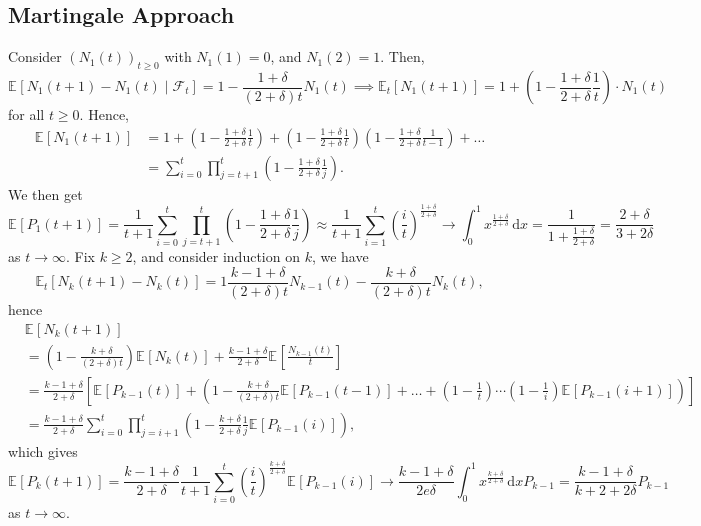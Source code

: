 \subsection{Martingale Approach}
Consider \((N_1(t))_{t \geq 0}\) with \(N_1(1) = 0\), and \(N_1(2) = 1\). Then,
\[
	\mathbb{E}_{}[N_1(t+1) - N_1(t) \mid \mathcal{F} _t]
	= 1 - \frac{1 + \delta }{(2 + \delta ) t} N_1(t)
	\implies \mathbb{E}_{t}[N_1(t+1)]
	= 1 + \left( 1 - \frac{1+\delta }{2 + \delta } \frac{1}{t} \right) \cdot N_1(t)
\]
for all \(t \geq 0\). Hence,
\[
	\begin{split}
		\mathbb{E}_{}[N_1(t+1)]
		 & = 1 + \left( 1 - \frac{1+\delta }{2 + \delta } \frac{1}{t} \right) + \left( 1 - \frac{1+\delta }{2 + \delta } \frac{1}{t} \right) \left( 1 - \frac{1+\delta }{2 + \delta } \frac{1}{t-1} \right) + \dots \\
		 & = \sum_{i=0}^{t} \prod_{j=t+1}^{t} \left( 1 - \frac{1 + \delta }{2 + \delta } \frac{1}{j} \right) .
	\end{split}
\]
We then get
\[
	\mathbb{E}_{}[P_1(t+1)]
	= \frac{1}{t+1} \sum_{i=0}^{t} \prod_{j=t+1}^{t} \left( 1 - \frac{1 + \delta }{2 + \delta } \frac{1}{j} \right)
	\approx \frac{1}{t+1} \sum_{i=1}^{t} \left( \frac{i}{t} \right) ^{\frac{1+\delta }{2 + \delta }}
	\to \int_{0}^{1} x^{\frac{1+\delta }{2 + \delta }} \,\mathrm{d}x
	= \frac{1}{1 + \frac{1+\delta }{2 + \delta }}
	= \frac{2+\delta }{3 + 2\delta }
\]
as \(t \to \infty \). Fix \(k \geq 2\), and consider induction on \(k\), we have
\[
	\mathbb{E}_{t}[N_k(t+1) - N_k(t)]
	= 1 \frac{k-1+\delta }{(2 + \delta ) t} N_{k-1}(t) - \frac{k+\delta }{(2 + \delta )t} N_k(t),
\]
hence
\[
	\begin{split}
		 & \mathbb{E}_{}[N_k(t+1)]                                                                                                                                                                                                                                                    \\
		 & = \left( 1 - \frac{k+\delta }{(2 + \delta )t} \right) \mathbb{E}_{}[N_k(t)] + \frac{k-1+\delta }{2+\delta } \mathbb{E}_{}\left[ \frac{N_{k-1}(t)}{t} \right]                                                                                                               \\
		 & = \frac{k-1+\delta }{2 + \delta } \left[ \mathbb{E}_{}[P_{k-1}(t)] + \left( 1 - \frac{k+\delta }{(2 + \delta )t} \mathbb{E}_{}[P_{k-1} (t-1)] + \dots + \left( 1 - \frac{1}{t} \right) \cdots \left( 1 - \frac{1}{i} \right) \mathbb{E}_{}[P_{k-1} (i+1)] \right)  \right] \\
		 & = \frac{k-1+\delta }{2 + \delta } \sum_{i=0}^{t} \prod_{j=i+1}^{t} \left( 1 - \frac{k+\delta }{2 + \delta } \frac{1}{j} \mathbb{E}_{}[P_{k-1} (i)] \right) ,
	\end{split}
\]
which gives
\[
	\mathbb{E}_{}[P_{k}(t+1)]
	= \frac{k-1+\delta }{2 + \delta } \frac{1}{t+1} \sum_{i=0}^{t} \left( \frac{i}{t} \right) ^{\frac{k+\delta }{2 + \delta }} \mathbb{E}_{}[P_{k-1}(i)]
	\to \frac{k-1+\delta }{2 e \delta } \int_{0}^{1} x^{\frac{k+\delta }{2 + \delta }} \,\mathrm{d}x P_{k-1}
	= \frac{k-1+\delta }{k+2+2\delta }P_{k-1}
\]
as \(t \to \infty \).

